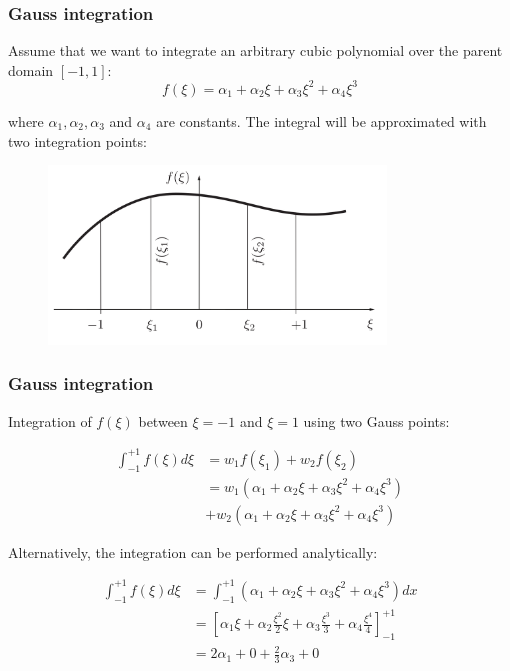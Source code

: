 \documentclass[notes]{beamer}
\begin{document}
\begin{frame}
\frametitle{Gauss integration}
Assume that we want to integrate an arbitrary cubic polynomial over the parent domain $[-1, 1]$:
\begin{equation*}
f(\xi) = \alpha_1 + \alpha_2 \xi + \alpha_3 \xi^2 + \alpha_4 \xi^3
\end{equation*}

where $\alpha_1, \alpha_2, \alpha_3$ and $\alpha_4$ are constants. The integral will be approximated with two integration points:
\begin{figure}[ht]
	\centering
	\includegraphics[width=0.8\textwidth]{figs/gauss-derivation.png}
\end{figure}
\end{frame}

\begin{frame}
\frametitle{Gauss integration}
Integration of $f(\xi)$ between $\xi = -1$ and $\xi = 1$ using two Gauss points:

\begin{align*}
	\int_{-1}^{+1}f(\xi) d\xi & = w_1 f(\xi_1) + w_2 f(\xi_2) \\
	& = w_1(\alpha_1 + \alpha_2 \xi + \alpha_3 \xi^2 + \alpha_4 \xi^3) \\
	& + w_2(\alpha_1 + \alpha_2 \xi + \alpha_3 \xi^2 + \alpha_4 \xi^3)
\end{align*}

Alternatively, the integration can be performed analytically:

\begin{align*}
	\int_{-1}^{+1}f(\xi) d\xi & = \int_{-1}^{+1}(\alpha_1 + \alpha_2 \xi + \alpha_3 \xi^2 + \alpha_4 \xi^3) dx \\
	& = \left[ \alpha_1 \xi + \alpha_2 \frac{\xi^2}{2}\xi + \alpha_3 \frac{\xi^3}{3} + \alpha_4 \frac{\xi^4}{4} \right]_{-1}^{+1} \\
	& = 2 \alpha_1 + 0 + \frac{2}{3} \alpha_3 + 0
\end{align*}
\end{frame}
\end{document}

